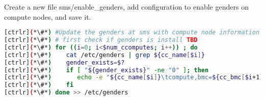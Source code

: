 	Create a new file sms/enable\_genders, add configuration to enable genders on compute nodes, and save it. 

 
 
 \begin{lstlisting}[language=bash,keywords={}]
[ctrlr](*\#*) #Update the genders at sms with compute node information
[ctrlr](*\#*) # first check if genders is install TBD
[ctrlr](*\#*) for ((i=0; i<$num_ccomputes; i++)) ; do
[ctrlr](*\#*)    cat /etc/genders | grep ${cc_name[$i]}
[ctrlr](*\#*)    gender_exists=$?
[ctrlr](*\#*)    if [ "${gender_exists}" -ne "0" ]; then 
[ctrlr](*\#*)       echo -e "${cc_name[$i]}\tcompute,bmc=${cc_bmc[$i+1]}"
[ctrlr](*\#*)    fi
[ctrlr](*\#*) done >> /etc/genders
 \end{lstlisting}
 
